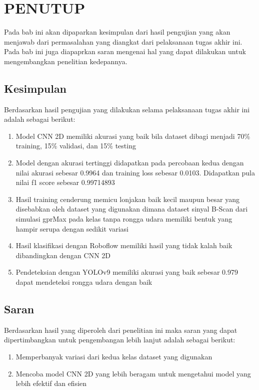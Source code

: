 \chapter{PENUTUP}
\label{chap:penutup}

Pada bab ini akan dipaparkan kesimpulan dari hasil pengujian yang akan menjawab dari permasalahan yang diangkat dari pelaksanaan tugas akhir ini. Pada bab ini juga diapaprkan saran mengenai hal yang dapat dilakukan untuk mengembangkan penelitian kedepannya.


\section{Kesimpulan}
\label{sec:kesimpulan}

Berdasarkan hasil pengujian yang dilakukan selama pelaksanaan tugas akhir ini adalah sebagai berikut:

\begin{enumerate}[nolistsep]
  \item Model CNN 2D memiliki akurasi yang baik bila dataset dibagi menjadi 70\% training, 15\% validasi, dan 15\% testing
  \item Model dengan akurasi tertinggi didapatkan pada percobaan kedua dengan nilai akurasi sebesar 0.9964 dan training loss sebesar 0.0103. Didapatkan pula nilai f1 score sebesar 0.99714893
  \item Hasil training cenderung memicu lonjakan baik kecil maupun besar yang disebabkan oleh dataset yang digunakan dimana dataset sinyal B-Scan dari simulasi gprMax pada kelas tanpa rongga udara memiliki bentuk yang hampir serupa dengan sedikit variasi
  \item Hasil klasifikasi dengan Roboflow memiliki hasil yang tidak kalah baik dibandingkan dengan CNN 2D
  \item Pendeteksian dengan YOLOv9 memiliki akurasi yang baik sebesar 0.979 dapat mendeteksi rongga udara dengan baik
\end{enumerate}

\section{Saran}
\label{chap:saran}

Berdasarkan hasil yang diperoleh dari penelitian ini maka saran yang dapat dipertimbangkan untuk pengembangan lebih lanjut adalah sebagai berikut:

\begin{enumerate}[nolistsep]
  \item Memperbanyak variasi dari kedua kelas dataset yang digunakan
  \item Mencoba model CNN 2D yang lebih beragam untuk mengetahui model yang lebih efektif dan efisien
\end{enumerate}
